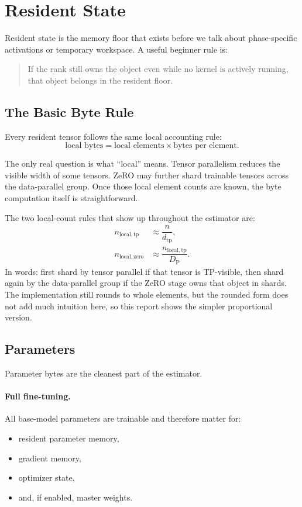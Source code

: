 \section{Resident State}
Resident state is the memory floor that exists before we talk about
phase-specific activations or temporary workspace. A useful beginner rule is:

\begin{quote}
If the rank still owns the object even while no kernel is actively running,
that object belongs in the resident floor.
\end{quote}

\subsection{The Basic Byte Rule}
Every resident tensor follows the same local accounting rule:
\[
\text{local bytes} = \text{local elements} \times \text{bytes per element}.
\]

The only real question is what ``local'' means. Tensor parallelism reduces the
visible width of some tensors. ZeRO may further shard trainable tensors across
the data-parallel group. Once those local element counts are known, the byte
computation itself is straightforward.

The two local-count rules that show up throughout the estimator are:
\begin{align*}
n_{\mathrm{local,tp}} &\approx \dfrac{n}{d_{\mathrm{tp}}}, \\
n_{\mathrm{local,zero}} &\approx \dfrac{n_{\mathrm{local,tp}}}{D_{\mathrm{P}}}.
\end{align*}
In words: first shard by tensor parallel if that tensor is TP-visible, then
shard again by the data-parallel group if the ZeRO stage owns that object in
shards.
The implementation still rounds to whole elements, but the rounded form does
not add much intuition here, so this report shows the simpler proportional
version.

\subsection{Parameters}
Parameter bytes are the cleanest part of the estimator.

\paragraph{Full fine-tuning.}
All base-model parameters are trainable and therefore matter for:
\begin{itemize}[leftmargin=1.5em]
\item resident parameter memory,
\item gradient memory,
\item optimizer state,
\item and, if enabled, master weights.
\end{itemize}

